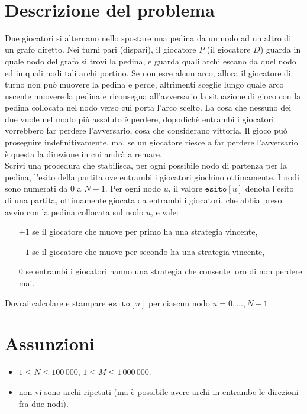 \documentclass[a4paper,11pt]{article}
\newcommand{\gara}{.}
\newcommand{\nome}{Chi si ferma \`e perduto}
\newcommand{\nomebreve}{dontstop}
\begin{document}
  \noindent{\Large \gara}
  \vspace{0.5cm}

  \noindent{\Huge \textbf \nome~(\texttt{\nomebreve})}
  \vspace{0.2cm}\\

  \section*{Descrizione del problema}

  \noindent
  Due giocatori si alternano nello spostare una pedina da un nodo ad un altro di un grafo diretto. Nei turni pari (dispari), il giocatore $P$ (il giocatore $D$) guarda in quale nodo del grafo si trovi la pedina, e guarda quali archi escano da quel nodo ed in quali nodi tali archi portino. Se non esce alcun arco, allora il giocatore di turno non pu\`o muovere la pedina e perde, altrimenti sceglie lungo quale arco uscente muovere la pedina e riconsegna all'avversario la situazione di gioco con la pedina collocata nel nodo verso cui porta l'arco scelto.
La cosa che nessuno dei due vuole nel modo pi\`u assoluto \`e perdere, dopodich\`e entrambi i giocatori vorrebbero far perdere l'avversario, cosa che considerano vittoria. Il gioco pu\`o proseguire indefinitivamente, ma, se un giocatore riesce a far perdere l'avversario \`e questa la direzione in cui andr\`a a remare.\\

Scrivi una procedura che stabilisca, per ogni possibile nodo di partenza per la pedina, l'esito della partita ove entrambi i giocatori giochino ottimamente.
I nodi sono numerati da $0$ a $N-1$.
Per ogni nodo $u$, il valore $\texttt{esito}[u]$ denota l'esito di una partita, ottimamente giocata da entrambi i giocatori, che abbia preso avvio con la pedina collocata sul nodo $u$, e vale:
\begin{itemize}
  \item[$+1$] se il giocatore che muove per primo ha una strategia vincente,
  \item[$-1$] se il giocatore che muove per secondo ha una strategia vincente,
  \item[$0$] se entrambi i giocatori hanno una strategia che consente loro di non perdere mai.
\end{itemize}
Dovrai calcolare e stampare $\texttt{esito}[u]$ per ciascun nodo $u = 0,\dots,N-1$.

\section*{Assunzioni}
\begin{itemize}[nolistsep, noitemsep]
    \item $1 \le N \le 100\,000$, $1 \le M \le 1\,000\,000$.
    \item non vi sono archi ripetuti (ma è possibile avere archi in entrambe le direzioni fra due nodi).
\end{itemize}
\end{document}
